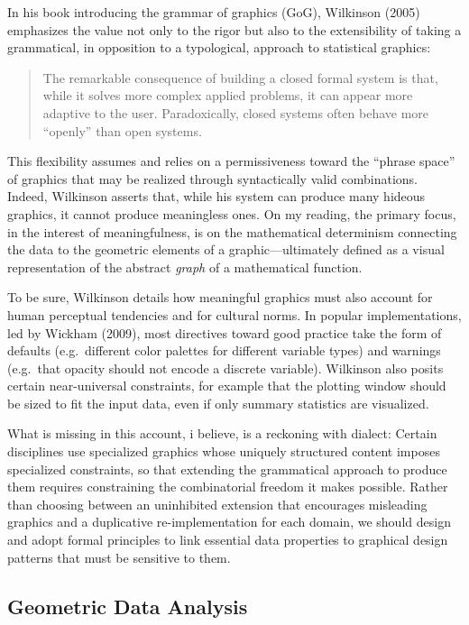 \documentclass[
]{article}
\begin{document}
In his book introducing the grammar of graphics (GoG), Wilkinson (2005)
emphasizes the value not only to the rigor but also to the extensibility
of taking a grammatical, in opposition to a typological, approach to
statistical graphics:

\begin{quote}
The remarkable consequence of building a closed formal system is that,
while it solves more complex applied problems, it can appear more
adaptive to the user. Paradoxically, closed systems often behave more
``openly'' than open systems.
\end{quote}

This flexibility assumes and relies on a permissiveness toward the
``phrase space'' of graphics that may be realized through syntactically
valid combinations. Indeed, Wilkinson asserts that, while his system can
produce many hideous graphics, it cannot produce meaningless ones. On my
reading, the primary focus, in the interest of meaningfulness, is on the
mathematical determinism connecting the data to the geometric elements
of a graphic---ultimately defined as a visual representation of the
abstract \emph{graph} of a mathematical function.

To be sure, Wilkinson details how meaningful graphics must also account
for human perceptual tendencies and for cultural norms. In popular
implementations, led by Wickham (2009), most directives toward good
practice take the form of defaults (e.g.~different color palettes for
different variable types) and warnings (e.g.~that opacity should not
encode a discrete variable). Wilkinson also posits certain
near-universal constraints, for example that the plotting window should
be sized to fit the input data, even if only summary statistics are
visualized.

What is missing in this account, i believe, is a reckoning with dialect:
Certain disciplines use specialized graphics whose uniquely structured
content imposes specialized constraints, so that extending the
grammatical approach to produce them requires constraining the
combinatorial freedom it makes possible. Rather than choosing between an
uninhibited extension that encourages misleading graphics and a
duplicative re-implementation for each domain, we should design and
adopt formal principles to link essential data properties to graphical
design patterns that must be sensitive to them.

\subsection{Geometric Data Analysis}\label{geometric-data-analysis}
\end{document}
